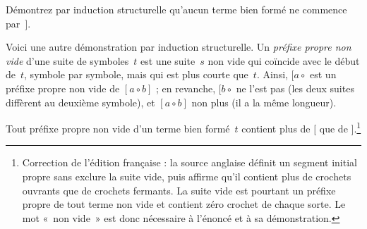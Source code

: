 \documentclass[../../../include/open-logic-section]{subfiles}
\begin{document}
\begin{prob}
  Démontrez par
  induction structurelle
  qu'aucun terme
  bien formé ne
  commence par~$]$.
\end{prob}

Voici une autre
démonstration par
induction structurelle.
Un \emph{préfixe propre
non vide} d'une
suite de symboles~$t$
est une suite~$s$
non vide qui coïncide
avec le début
de~$t$, symbole
par symbole, mais
qui est plus courte
que~$t$. Ainsi,
$[a \circ {}$
est un préfixe
propre non vide
de $[a \circ b]$ ;
en revanche,
$[b \circ {}$
ne l'est pas
(les deux suites
diffèrent au
deuxième symbole),
et $[a \circ b]$
non plus (il
a la même
longueur).

\begin{prop}
  Tout préfixe
  propre non vide
  d'un terme
  bien formé~$t$
contient plus
de $[$ que
de $]$.\footnote{
Correction de l'édition française :
la source anglaise définit un
segment initial propre sans
exclure la suite vide, puis
affirme qu'il contient plus
de crochets ouvrants que de
crochets fermants. La suite
vide est pourtant un préfixe
propre de tout terme non vide
et contient zéro crochet de
chaque sorte. Le mot
«~non vide~» est donc
nécessaire à l'énoncé
et à sa démonstration.}
\end{prop}
\end{document}
